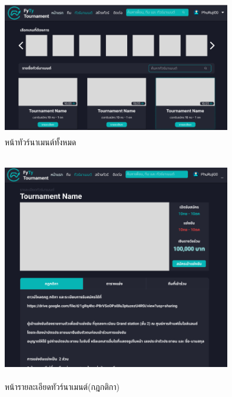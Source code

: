 \begin{figure}[h]
  \begin{center}
  \includegraphics[width=10cm,height=6cm,keepaspectratio]{allTour.png}
  \end{center}
  \caption[หน้าทัวร์นาเมนต์ทั้งหมด]{หน้าทัวร์นาเมนต์ทั้งหมด}
  \label{fig:หน้าทัวร์นาเมนต์ทั้งหมด}
\end{figure}

\begin{figure}[h]
  \begin{center}
  \includegraphics[width=10cm,height=10cm,keepaspectratio]{tourRule.png}
  \end{center}
  \caption[หน้ารายละเอียดทัวร์นาเมนต์(กฎกติกา)]{หน้ารายละเอียดทัวร์นาเมนต์(กฎกติกา)}
  \label{fig:หน้ารายละเอียดทัวร์นาเมนต์(กฎกติกา)}
\end{figure}

